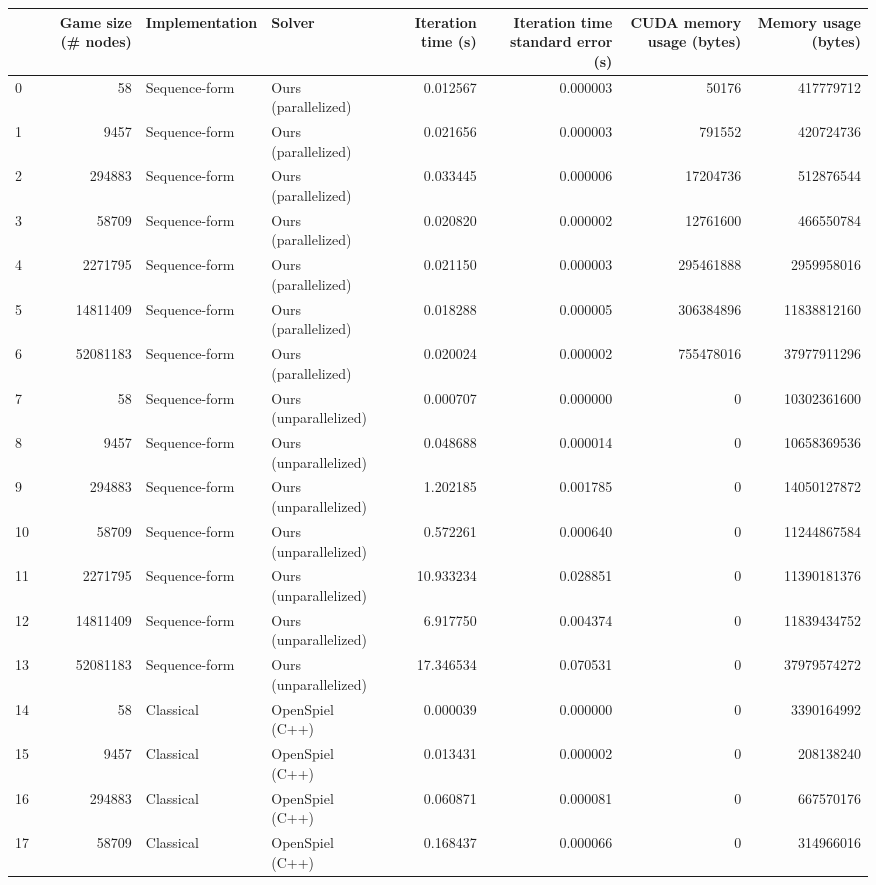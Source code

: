 \begin{tabular}{lrllrrrr}
\toprule
 & Game size (# nodes) & Implementation & Solver & Iteration time (s) & Iteration time standard error (s) & CUDA memory usage (bytes) & Memory usage (bytes) \\
\midrule
0 & 58 & Sequence-form & Ours (parallelized) & 0.012567 & 0.000003 & 50176 & 417779712 \\
1 & 9457 & Sequence-form & Ours (parallelized) & 0.021656 & 0.000003 & 791552 & 420724736 \\
2 & 294883 & Sequence-form & Ours (parallelized) & 0.033445 & 0.000006 & 17204736 & 512876544 \\
3 & 58709 & Sequence-form & Ours (parallelized) & 0.020820 & 0.000002 & 12761600 & 466550784 \\
4 & 2271795 & Sequence-form & Ours (parallelized) & 0.021150 & 0.000003 & 295461888 & 2959958016 \\
5 & 14811409 & Sequence-form & Ours (parallelized) & 0.018288 & 0.000005 & 306384896 & 11838812160 \\
6 & 52081183 & Sequence-form & Ours (parallelized) & 0.020024 & 0.000002 & 755478016 & 37977911296 \\
7 & 58 & Sequence-form & Ours (unparallelized) & 0.000707 & 0.000000 & 0 & 10302361600 \\
8 & 9457 & Sequence-form & Ours (unparallelized) & 0.048688 & 0.000014 & 0 & 10658369536 \\
9 & 294883 & Sequence-form & Ours (unparallelized) & 1.202185 & 0.001785 & 0 & 14050127872 \\
10 & 58709 & Sequence-form & Ours (unparallelized) & 0.572261 & 0.000640 & 0 & 11244867584 \\
11 & 2271795 & Sequence-form & Ours (unparallelized) & 10.933234 & 0.028851 & 0 & 11390181376 \\
12 & 14811409 & Sequence-form & Ours (unparallelized) & 6.917750 & 0.004374 & 0 & 11839434752 \\
13 & 52081183 & Sequence-form & Ours (unparallelized) & 17.346534 & 0.070531 & 0 & 37979574272 \\
14 & 58 & Classical & OpenSpiel (C++) & 0.000039 & 0.000000 & 0 & 3390164992 \\
15 & 9457 & Classical & OpenSpiel (C++) & 0.013431 & 0.000002 & 0 & 208138240 \\
16 & 294883 & Classical & OpenSpiel (C++) & 0.060871 & 0.000081 & 0 & 667570176 \\
17 & 58709 & Classical & OpenSpiel (C++) & 0.168437 & 0.000066 & 0 & 314966016 \\

\end{tabular}
